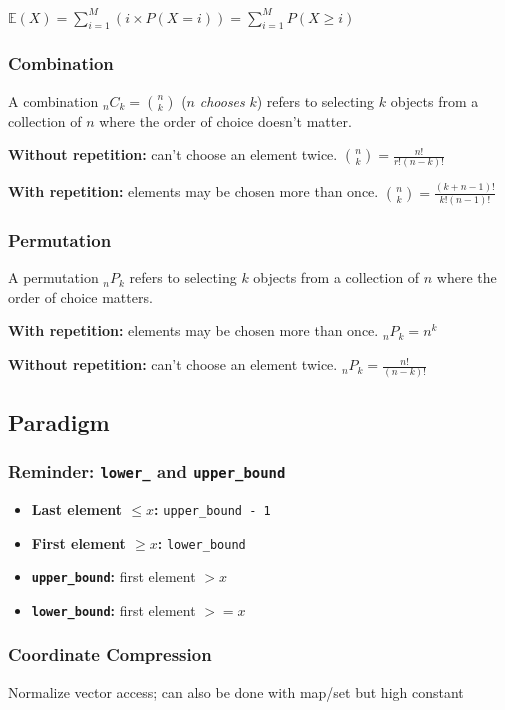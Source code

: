 \documentclass[12pt, a4paper, twoside]{article}
\begin{document}
$\mathbb{E}(X) = \sum_{i=1}^{M} (i \times P(X=i)) = \sum_{i=1}^{M} P(X \geq i)$

\subsubsection{Combination}
A combination ${}_nC_k = \binom{n}{k}$ ($n$ \textit{chooses} $k$) refers to selecting $k$ objects from a collection of $n$ where the order of choice doesn't matter.

\textbf{Without repetition:} can't choose an element twice. $\binom{n}{k} = \frac{n!}{r!(n-k)!}$

\textbf{With repetition:} elements may be chosen more than once. $\binom{n}{k} = \frac{(k+n-1)!}{k!(n-1)!}$

\subsubsection{Permutation}
A permutation ${}_nP_k$ refers to selecting $k$ objects from a collection of $n$ where the order of choice matters.

\textbf{With repetition:} elements may be chosen more than once. ${}_nP_k = n^k$

\textbf{Without repetition:} can't choose an element twice. ${}_nP_k = \frac{n!}{(n-k)!}$

\subsection{Paradigm}
\subsubsection{Reminder: \texttt{lower\_} and \texttt{upper\_bound}}
\begin{itemize}
  \item \textbf{Last element $\leq x$:} \texttt{upper\_bound - 1}
  \item \textbf{First element $\geq x$:} \texttt{lower\_bound}
  \item \textbf{\texttt{upper\_bound}:} first element $> x$
  \item \textbf{\texttt{lower\_bound}:} first element $>= x$
\end{itemize}
\subsubsection{Coordinate Compression}
Normalize vector access; can also be done with map/set but high constant
\end{document}
